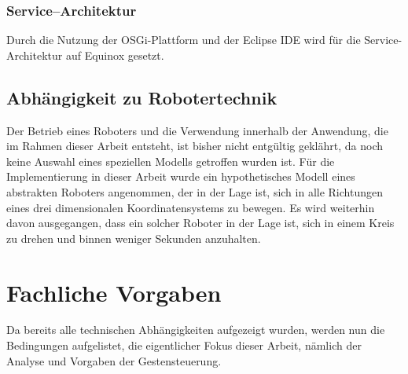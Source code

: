 \subsubsection{Service--Architektur}
Durch die Nutzung der OSGi-Plattform und der \gls{Eclipse} \acrshort{IDE} wird f\"ur die Service-Architektur auf \gls{Equinox} gesetzt. 

\subsection{Abh\"angigkeit zu Robotertechnik}
\label{subsec:Robot}
Der Betrieb eines Roboters und die Verwendung innerhalb der Anwendung, die im Rahmen dieser Arbeit entsteht, ist bisher nicht entg\"ultig gekl\"ahrt, da noch keine Auswahl eines speziellen Modells getroffen wurden ist.
\newline
F\"ur die Implementierung in dieser Arbeit wurde ein hypothetisches Modell eines abstrakten Roboters angenommen, der in der Lage ist, sich in alle Richtungen eines drei dimensionalen Koordinatensystems zu bewegen. Es wird weiterhin davon ausgegangen, dass ein solcher Roboter in der Lage ist, sich in einem Kreis zu drehen und binnen weniger Sekunden anzuhalten.

\section{Fachliche Vorgaben}
Da bereits alle technischen Abh\"angigkeiten aufgezeigt wurden, werden nun die Bedingungen aufgelistet, die eigentlicher Fokus dieser Arbeit, n\"amlich der Analyse und Vorgaben der Gestensteuerung.

